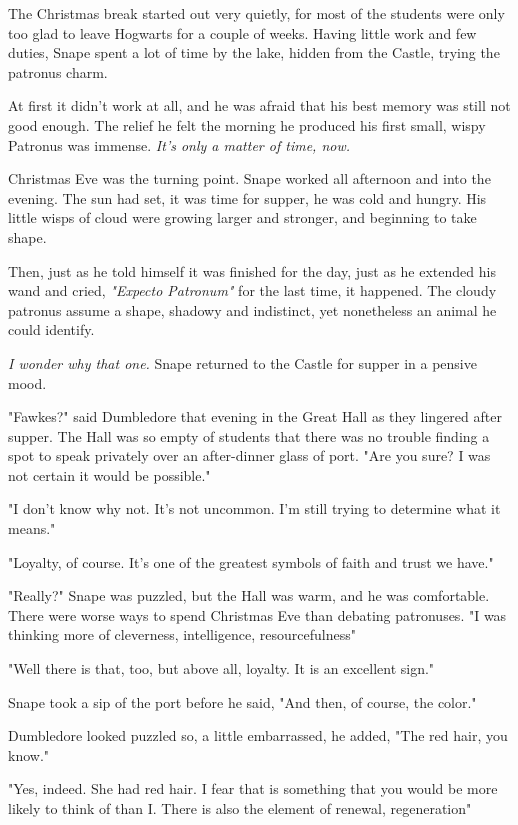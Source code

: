 The Christmas break started out very quietly, for most of the students were only too glad to leave Hogwarts for a couple of weeks. Having little work and few duties, Snape spent a lot of time by the lake, hidden from the Castle, trying the patronus charm.

At first it didn't work at all, and he was afraid that his best memory was still not good enough. The relief he felt the morning he produced his first small, wispy Patronus was immense. \emph{It's only a matter of time, now.}

Christmas Eve was the turning point. Snape worked all afternoon and into the evening. The sun had set, it was time for supper, he was cold and hungry. His little wisps of cloud were growing larger and stronger, and beginning to take shape.

Then, just as he told himself it was finished for the day, just as he extended his wand and cried, \emph{"Expecto Patronum"} for the last time, it happened. The cloudy patronus assume a shape, shadowy and indistinct, yet nonetheless an animal he could identify.

\emph{I wonder why that one.} Snape returned to the Castle for supper in a pensive mood.

"Fawkes?" said Dumbledore that evening in the Great Hall as they lingered after supper. The Hall was so empty of students that there was no trouble finding a spot to speak privately over an after-dinner glass of port. "Are you sure? I was not certain it would be possible."

"I don't know why not. It's not uncommon. I'm still trying to determine what it means."

"Loyalty, of course. It's one of the greatest symbols of faith and trust we have."

"Really?" Snape was puzzled, but the Hall was warm, and he was comfortable. There were worse ways to spend Christmas Eve than debating patronuses. "I was thinking more of cleverness, intelligence, resourcefulness{\el}"

"Well there is that, too, but above all, loyalty. It is an excellent sign."

Snape took a sip of the port before he said, "And then, of course, the color."

Dumbledore looked puzzled so, a little embarrassed, he added, "The red hair, you know."

"Yes, indeed. She had red hair. I fear that is something that you would be more likely to think of than I. There is also the element of renewal, regeneration{\el}"

